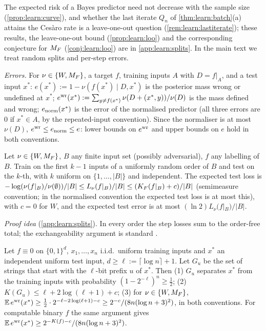 The expected risk of a Bayes predictor need not decrease with the sample size (\cref{prop:learn:curve}), and whether the last iterate $Q_n$ of \cref{thm:learn:batch}(a) attains the Ces\`aro rate is a leave-one-out question (\cref{rem:learn:lastiterate}); these results, the leave-one-out bound (\cref{prop:learn:loo}) and the corresponding conjecture for $M_{F}$ (\cref{conj:learn:loo}) are in \cref{app:learn:splits}. In the main text we treat random splits and per-step errors.

\emph{Errors.} For $\nu\in\{W,M_{F}\}$, a target $f$, training inputs $A$ with $D=f|_A$, and a test input $x^*$: $e(x^*):=1-\nu(f(x^*)\mid D,x^*)$ is the posterior mass wrong or undefined at $x^*$; $e^{\rm wr}(x^*):=\sum_{y\ne f(x^*)}\nu(D+(x^*,y))/\nu(D)$ is the mass defined and wrong; $e_{\rm norm}(x^*)$ is the error of the normalised predictor (all three errors are $0$ if $x^*\in A$, by the repeated-input convention). Since the normaliser is at most $\nu(D)$, $e^{\rm wr}\le e_{\rm norm}\le e$: lower bounds on $e^{\rm wr}$ and upper bounds on $e$ hold in both conventions.

\begin{proposition}\label{prop:learn:splits}
Let $\nu\in\{W,M_{F}\}$, $B$ any finite input set (possibly adversarial), $f$ any labelling of $B$. Train on the first $k-1$ inputs of a uniformly random order of $B$ and test on the $k$-th, with $k$ uniform on $\{1,\dots,|B|\}$ and independent. The expected test loss is $-\log(\nu(f|_B)/\nu(\emptyset))/|B|\le L_\nu(f|_B)/|B|\le(K_{F}(f|_B)+c)/|B|$ (semimeasure convention; in the normalised convention the expected test loss is at most this), with $c=0$ for $W$, and the expected test error is at most $(\ln2)L_\nu(f|_B)/|B|$.
\end{proposition}

\emph{Proof idea} (\cref{app:learn:splits}). In every order the step losses sum to the order-free total; the exchangeability argument is standard \citep{cesabianchi2004generalization}.

\begin{proposition}\label{prop:learn:typical}
Let $f\equiv0$ on $\{0,1\}^d$, $x_1,\dots,x_n$ i.i.d.\ uniform training inputs and $x^*$ an independent uniform test input, $d\ge\ell:=\lceil\log n\rceil+1$. Let $G_u$ be the set of strings that start with the $\ell$-bit prefix $u$ of $x^*$. Then (1) $G_u$ separates $x^*$ from the training inputs with probability $(1-2^{-\ell})^n\ge\frac12$; (2) $K(G_u)\le\ell+2\log(\ell+1)+c$; (3) for $\nu\in\{W,M_{F}\}$, $\mathbb{E}\,e^{\rm wr}(x^*)\ge\frac12\cdot2^{-\ell-2\log(\ell+1)-c}\ge2^{-c}/(8n(\log n+3)^2)$, in both conventions. For computable binary $f$ the same argument gives $\mathbb{E}\,e^{\rm wr}(x^*)\ge2^{-K(f)-c}/(8n(\log n+3)^2)$.
\end{proposition}

